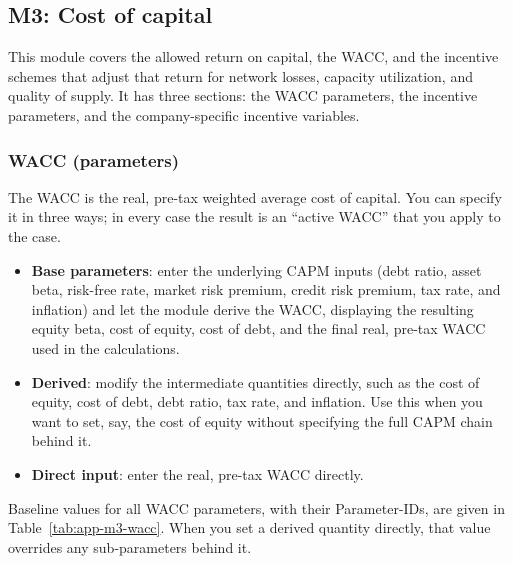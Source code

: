 \subsection{M3: Cost of capital}
\label{sec:spec-m3}

This module covers the allowed return on capital, the WACC, and the incentive schemes that adjust that return for network losses, capacity utilization, and quality of supply. It has three sections: the WACC parameters, the incentive parameters, and the company-specific incentive variables.

\subsubsection{WACC (parameters)}
The WACC is the real, pre-tax weighted average cost of capital. You can specify it in three ways; in every case the result is an ``active WACC'' that you apply to the case.

\begin{itemize}
  \item \textbf{Base parameters}: enter the underlying CAPM inputs (debt ratio, asset beta, risk-free rate, market risk premium, credit risk premium, tax rate, and inflation) and let the module derive the WACC, displaying the resulting equity beta, cost of equity, cost of debt, and the final real, pre-tax WACC used in the calculations.
  \item \textbf{Derived}: modify the intermediate quantities directly, such as the cost of equity, cost of debt, debt ratio, tax rate, and inflation. Use this when you want to set, say, the cost of equity without specifying the full CAPM chain behind it.
  \item \textbf{Direct input}: enter the real, pre-tax WACC directly.
\end{itemize}

\noindent Baseline values for all WACC parameters, with their Parameter-IDs, are given in Table~\ref{tab:app-m3-wacc}. When you set a derived quantity directly, that value overrides any sub-parameters behind it.

